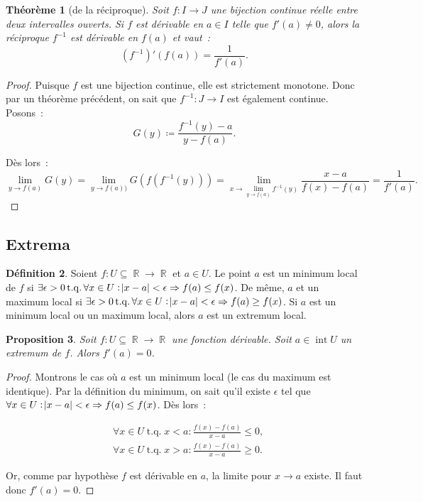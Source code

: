 \documentclass{article}
\DeclareMathOperator{\intr}{int}
\DeclareMathOperator{\R}{\mathbb R}
\DeclareMathOperator{\tq}{ t.q. }
\newtheorem{thm}{Théorème}[section]
\newtheorem{prp}[thm]{Proposition}
\theoremstyle{definition}
\newtheorem{déf}[thm]{Définition}
\theoremstyle{remark}
\begin{document}
		\begin{thm}[de la réciproque] Soit $f : I \to J$ une bijection continue réelle entre deux intervalles ouverts. Si $f$ est dérivable en $a \in I$ telle
		que $f'(a) \neq 0$, alors la réciproque $f^{-1}$ est dérivable en $f(a)$ et vaut~:
		\[\left(f^{-1}\right)'(f(a)) = \frac 1{f'(a)}.\]
		\end{thm}

		\begin{proof} Puisque $f$ est une bijection continue, elle est strictement monotone. Donc par un théorème précédent, on sait que $f^{-1} : J \to I$
		est également continue. Posons~:
		\[G(y) \coloneqq \frac {f^{-1}(y) - a}{y - f(a)}.\]

		Dès lors~:
		\[\lim_{y \to f(a)} G(y) = \lim_{y \to f(a))}G(f(f^{-1}(y))) = \lim_{x \to \lim_{y \to f(a)}f^{-1}(y)}\frac {x-a}{f(x)-f(a)} = \frac 1{f'(a)}.\]
		\end{proof}
	
	\subsection{Extrema}
		
		\begin{déf} Soient $f : U \subseteq \R \to \R$ et $a \in U$. Le point $a$ est un minimum local de $f$ si
		$\exists \epsilon > 0 \tq \forall x \in U : \abs{x-a} < \epsilon \Rightarrow f(a) \leq f(x)$. De même, $a$ et un maximum local si
		$\exists \epsilon > 0 \tq \forall x \in U : \abs{x-a} < \epsilon \Rightarrow f(a) \geq f(x)$. Si $a$ est un minimum local ou un maximum local, alors $a$ est
		un extremum local. \end{déf}

		\begin{prp} Soit $f : U \subseteq \R \to \R$ une fonction dérivable. Soit $a \in \intr U$ un extremum de $f$. Alors $f'(a) = 0$. \end{prp}

		\begin{proof} Montrons le cas où $a$ est un minimum local (le cas du maximum est identique). Par la définition du minimum, on sait qu'il existe
		$\epsilon$ tel que $\forall x \in U : \abs{x-a} < \epsilon \Rightarrow f(a) \leq f(x)$. Dès lors~:

		\begin{align*}
			&\forall x \in U \tq x < a : \frac {f(x)-f(a)}{x-a} \leq 0, \\
			&\forall x \in U \tq x > a : \frac {f(x)-f(a)}{x-a} \geq 0.
		\end{align*}

		Or, comme par hypothèse $f$ est dérivable en $a$, la limite pour $x \to a$ existe. Il faut donc $f'(a) = 0$. \end{proof}
\end{document}
